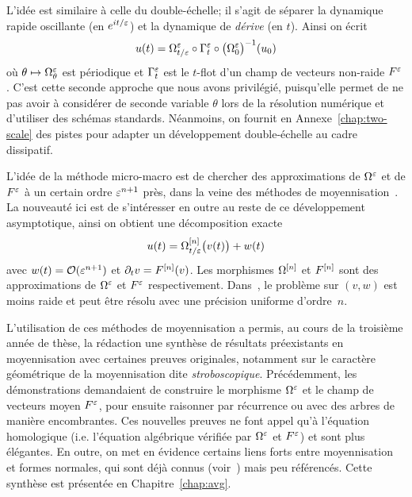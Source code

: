 %
%
L'idée est similaire à celle du double-échelle; il s'agit de séparer la dynamique rapide oscillante (en $e^{it/\varepsilon}$) et la dynamique de \textit{dérive} (en $t$). Ainsi on écrit 
\begin{equation*}
    u(t) = \Omega^{\varepsilon}_{t/\varepsilon} \circ \Gamma^{\varepsilon}_t \circ \big( \Omega^{\varepsilon}_0 \big)^{-1} (u_0)
\end{equation*}
où $\theta \mapsto \Omega^{\varepsilon}_\theta$ est périodique et $\Gamma^{\varepsilon}_t$ est le $t$-flot d'un champ de vecteurs non-raide $F^{\varepsilon}$. C'est cette seconde approche que nous avons privilégié, puisqu'elle permet de ne pas avoir à considérer de seconde variable $\theta$ lors de la résolution numérique et d'utiliser des schémas standards. Néanmoins, on fournit en Annexe~\ref{chap:two-scale} des pistes pour adapter un développement double-échelle au cadre dissipatif. 

L'idée de la méthode micro-macro est de chercher des approximations de $\Omega^{\varepsilon}$ et de $F^{\varepsilon}$ à un certain ordre $\varepsilon^{n+1}$ près, dans la veine des méthodes de moyennisation~\cite{perko.1969.higher,lochak.1988.multiphase,sanders.2007.averaging,chartier.2010.higher,chartier.2012.formal,castella.2015.stroboscopic}. La nouveauté ici est de s'intéresser en outre au reste de ce développement asymptotique, ainsi on obtient une décomposition exacte 
\begin{equation*}
    u(t) = \Omega^{[n]}_{t/\varepsilon} \big( v(t) \big) + w(t)
\end{equation*}
avec $w(t) = \mathcal{O}(\varepsilon^{n+1})$ et $\partial_t v = F^{[n]}(v)$. Les morphismes $\Omega^{[n]}$ et $F^{[n]}$ sont des approximations de $\Omega^{\varepsilon}$ et $F^{\varepsilon}$ respectivement. Dans~\cite{chartier.2020.new}, le problème sur $(v,w)$ est moins raide et peut être résolu avec une précision uniforme d'ordre~$n$. 


L'utilisation de ces méthodes de moyennisation a permis, au cours de la troisième année de thèse, la rédaction une synthèse de résultats préexistants en moyennisation avec certaines preuves originales, notamment sur le caractère géométrique de la moyennisation dite \textit{stroboscopique}. Précédemment, les démonstrations demandaient de construire le morphisme $\Omega^{\varepsilon}$ et le champ de vecteurs moyen $F^{\varepsilon}$, pour ensuite raisonner par récurrence ou avec des arbres de manière encombrantes. Ces nouvelles preuves ne font appel qu'à l'équation homologique (i.e. l'équation algébrique vérifiée par $\Omega^{\varepsilon}$ et $F^{\varepsilon}$) et sont plus élégantes. En outre, on met en évidence certains liens forts entre moyennisation et formes normales, qui sont déjà connus (voir~\cite{sanders.2007.averaging}) mais peu référencés. Cette synthèse est présentée en Chapitre~\ref{chap:avg}. 


